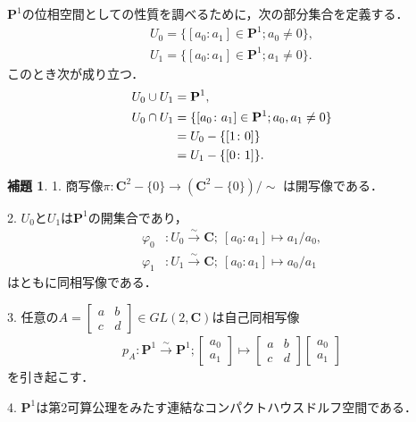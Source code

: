 \documentclass[11pt, a4paper, dvipdfmx, draft]{jsarticle}
\theoremstyle{definition}
\newtheorem{Lemma}[Axiom]{補題}
\newcommand{\cc}{\mathbf{C}}
\newcommand{\pp}{\mathbf{P}}
\newcommand{\dip}{\displaystyle} %
\newcommand{\pphi}{\varphi} %
\theoremstyle{mystyle}
\numberwithin{equation}{section} %
\begin{document}
$\pp^1$の位相空間としての性質を調べるために，次の部分集合を定義する．
\begin{align*}
    U_0=\{[a_0\colon a_1]\in\pp^1; a_0\neq0\},\\
    U_1=\{[a_0\colon a_1]\in\pp^1; a_1\neq0\}.
\end{align*}
このとき次が成り立つ．
\begin{align}
    U_0\cup U_1 &= \pp^1, \label{eq:cov1}\\
    U_0\cap U_1 
    &= \{[a_0\colon a_1]\in\pp^1; a_0, a_1\neq0\} \label{eq:inter-p1}\\
    &= U_0 - \{[1\colon 0]\}  \notag\\
    &= U_1 - \{[0\colon 1]\}. \notag
\end{align}

\begin{Lemma}\label{mnf:p1}
    1. 
    商写像$\pi \colon \cc^{2}-\{0\}
    \longrightarrow\left(\cc^{2}-\{0\}\right)/{\sim}$
    は開写像である．

    2. 
    $U_0$と$U_1$は$\pp^1$の開集合であり，
    \begin{align*}
        \pphi_0&\colon U_0\overset{{\sim}}{\longrightarrow}\cc;\ [a_0\colon a_1]\mapsto a_1/a_0,\\
        \pphi_1&\colon U_1\overset{{\sim}}{\longrightarrow}\cc;\ [a_0\colon a_1]\mapsto a_0/a_1
    \end{align*}
    はともに同相写像である．

    3. 
    任意の$\dip A = \begin{bmatrix}
        a&b\\c&d
    \end{bmatrix}\in GL(2,\cc)$は自己同相写像
    \begin{align*}
        p_A\colon \pp^1\overset{{\sim}}{\longrightarrow}\pp^1;
        \begin{bmatrix}
            a_0\\a_1
        \end{bmatrix}
        \mapsto
        \begin{bmatrix}
            a&b\\c&d
        \end{bmatrix}
        \begin{bmatrix}
            a_0\\a_1
        \end{bmatrix}
    \end{align*}
    を引き起こす．

    4. 
    $\pp^1$は第2可算公理をみたす連結なコンパクトハウスドルフ空間である．
\end{Lemma}
\end{document}
